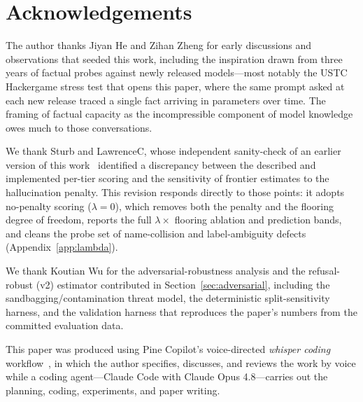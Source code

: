 \documentclass[11pt]{article}
\begin{document}
\section*{Acknowledgements}

The author thanks Jiyan He and Zihan Zheng for early discussions and observations that seeded this work, including the inspiration drawn from three years of factual probes against newly released models---most notably the USTC Hackergame stress test that opens this paper, where the same prompt asked at each new release traced a single fact arriving in parameters over time. The framing of factual capacity as the incompressible component of model knowledge owes much to those conversations. 

We thank Sturb and LawrenceC, whose independent sanity-check of an earlier version of this work~\citep{sturb2026sanity} identified a discrepancy between the described and implemented per-tier scoring and the sensitivity of frontier estimates to the hallucination penalty. This revision responds directly to those points: it adopts no-penalty scoring ($\lambda = 0$), which removes both the penalty and the flooring degree of freedom, reports the full $\lambda \times$ flooring ablation and prediction bands, and cleans the probe set of name-collision and label-ambiguity defects (Appendix~\ref{app:lambda}).

We thank Koutian Wu for the adversarial-robustness analysis and the refusal-robust (v2) estimator contributed in Section~\ref{sec:adversarial}, including the sandbagging/contamination threat model, the deterministic split-sensitivity harness, and the validation harness that reproduces the paper's numbers from the committed evaluation data.

This paper was produced using Pine Copilot's voice-directed \emph{whisper coding} workflow~\citep{pineai2026whispercoding}, in which the author specifies, discusses, and reviews the work by voice while a coding agent---Claude Code with Claude Opus 4.8---carries out the planning, coding, experiments, and paper writing.




\clearpage
\appendix

\end{document}
